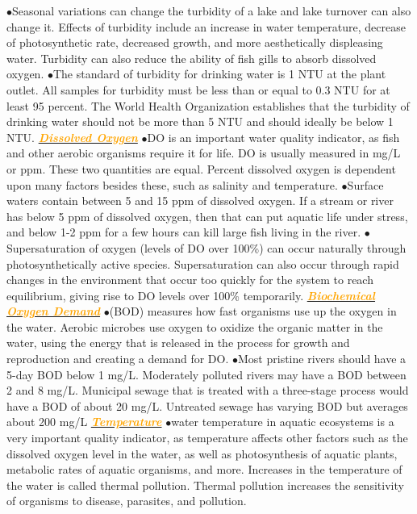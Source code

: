 \documentclass{article}
\newcommand{\ddd}{$\bullet$}
\newcommand{\orange}[1]{\textcolor{orange}{#1}}
\newcommand{\mysubsection}[1]{\underline{\textbf{{\textit{\orange{#1}}}}}}
\begin{document}
\begin{multicols*}{4}
            \ddd Seasonal variations can change the turbidity of a lake and lake turnover can also change it. Effects of turbidity include an increase in water temperature, decrease of photosynthetic rate, decreased growth, and more aesthetically displeasing water. Turbidity can also reduce the ability of fish gills to absorb dissolved oxygen. 
            \ddd The standard of turbidity for drinking water is 1 NTU at the plant outlet. All samples for turbidity must be less than or equal to 0.3 NTU for at least 95 percent. The World Health Organization establishes that the turbidity of drinking water should not be more than 5 NTU and should ideally be below 1 NTU. 
        \mysubsection{Dissolved Oxygen}
            \ddd DO is an important water quality indicator, as fish and other aerobic organisms require it for life. DO is usually measured in mg/L or ppm. These two quantities are equal. Percent dissolved oxygen is dependent upon many factors besides these, such as salinity and temperature.
            \ddd Surface waters contain between 5 and 15 ppm of dissolved oxygen. If a stream or river has below 5 ppm of dissolved oxygen, then that can put aquatic life under stress, and below 1-2 ppm for a few hours can kill large fish living in the river.
            \ddd Supersaturation of oxygen (levels of DO over 100\%) can occur naturally through photosynthetically active species. Supersaturation can also occur through rapid changes in the environment that occur too quickly for the system to reach equilibrium, giving rise to DO levels over 100\% temporarily. 
        \mysubsection{Biochemical Oxygen Demand}
            \ddd (BOD) measures how fast organisms use up the oxygen in the water. Aerobic microbes use oxygen to oxidize the organic matter in the water, using the energy that is released in the process for growth and reproduction and creating a demand for DO.
            \ddd Most pristine rivers should have a 5-day BOD below 1 mg/L. Moderately polluted rivers may have a BOD between 2 and 8 mg/L. Municipal sewage that is treated with a three-stage process would have a BOD of about 20 mg/L. Untreated sewage has varying BOD but averages about 200 mg/L    
        \mysubsection{Temperature}
            \ddd water temperature in aquatic ecosystems is a very important quality indicator, as temperature affects other factors such as the dissolved oxygen level in the water, as well as photosynthesis of aquatic plants, metabolic rates of aquatic organisms, and more. Increases in the temperature of the water is called thermal pollution. Thermal pollution increases the sensitivity of organisms to disease, parasites, and pollution.

\end{multicols*}
\end{document}
